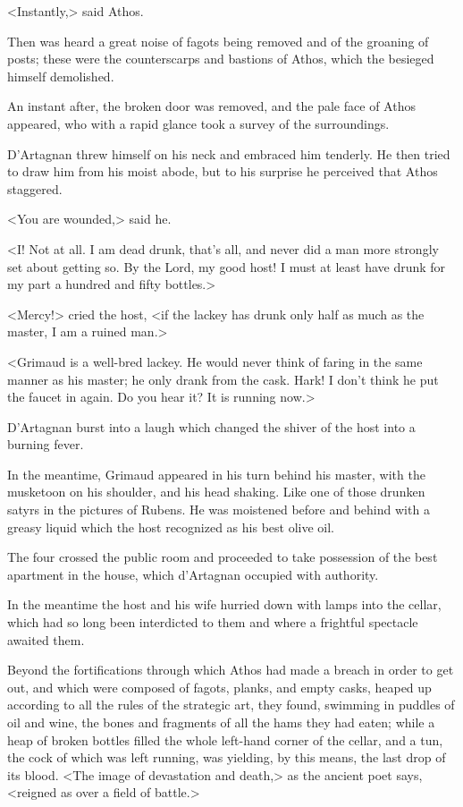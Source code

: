 <Instantly,> said Athos. 

Then was heard a great noise of fagots being removed and of the groaning of posts; these were the counterscarps and bastions of Athos, which the besieged himself demolished. 

An instant after, the broken door was removed, and the pale face of Athos appeared, who with a rapid glance took a survey of the surroundings. 

D'Artagnan threw himself on his neck and embraced him tenderly. He then tried to draw him from his moist abode, but to his surprise he perceived that Athos staggered. 

<You are wounded,> said he. 

<I! Not at all. I am dead drunk, that's all, and never did a man more strongly set about getting so. By the Lord, my good host! I must at least have drunk for my part a hundred and fifty bottles.> 

<Mercy!> cried the host, <if the lackey has drunk only half as much as the master, I am a ruined man.> 

<Grimaud is a well-bred lackey. He would never think of faring in the same manner as his master; he only drank from the cask. Hark! I don't think he put the faucet in again. Do you hear it? It is running now.> 

D'Artagnan burst into a laugh which changed the shiver of the host into a burning fever. 

In the meantime, Grimaud appeared in his turn behind his master, with the musketoon on his shoulder, and his head shaking. Like one of those drunken satyrs in the pictures of Rubens. He was moistened before and behind with a greasy liquid which the host recognized as his best olive oil. 

The four crossed the public room and proceeded to take possession of the best apartment in the house, which d'Artagnan occupied with authority. 

In the meantime the host and his wife hurried down with lamps into the cellar, which had so long been interdicted to them and where a frightful spectacle awaited them. 

Beyond the fortifications through which Athos had made a breach in order to get out, and which were composed of fagots, planks, and empty casks, heaped up according to all the rules of the strategic art, they found, swimming in puddles of oil and wine, the bones and fragments of all the hams they had eaten; while a heap of broken bottles filled the whole left-hand corner of the cellar, and a tun, the cock of which was left running, was yielding, by this means, the last drop of its blood. <The image of devastation and death,> as the ancient poet says, <reigned as over a field of battle.> 

